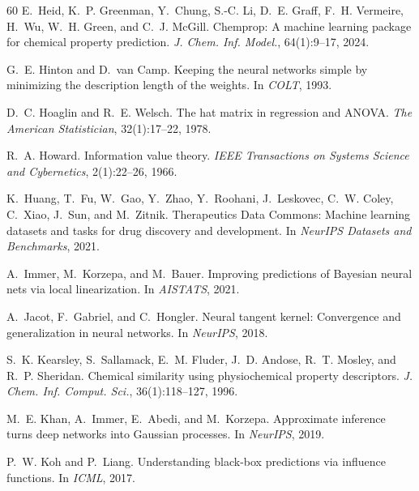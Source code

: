 \documentclass[10pt,twocolumn,letterpaper]{article}
\theoremstyle{definition}
\begin{document}
\begin{thebibliography}{60}
E.~Heid, K.~P. Greenman, Y.~Chung, S.-C. Li, D.~E. Graff, F.~H. Vermeire, H.~Wu, W.~H. Green, and C.~J. McGill.
\newblock Chemprop: A machine learning package for chemical property prediction.
\newblock \emph{J. Chem. Inf. Model.}, 64(1):9--17, 2024.

G.~E. Hinton and D.~van Camp.
\newblock Keeping the neural networks simple by minimizing the description length of the weights.
\newblock In \emph{COLT}, 1993.

D.~C. Hoaglin and R.~E. Welsch.
\newblock The hat matrix in regression and {ANOVA}.
\newblock \emph{The American Statistician}, 32(1):17--22, 1978.

R.~A. Howard.
\newblock Information value theory.
\newblock \emph{IEEE Transactions on Systems Science and Cybernetics}, 2(1):22--26, 1966.

K.~Huang, T.~Fu, W.~Gao, Y.~Zhao, Y.~Roohani, J.~Leskovec, C.~W. Coley, C.~Xiao, J.~Sun, and M.~Zitnik.
\newblock Therapeutics {D}ata {C}ommons: Machine learning datasets and tasks for drug discovery and development.
\newblock In \emph{NeurIPS Datasets and Benchmarks}, 2021.

A.~Immer, M.~Korzepa, and M.~Bauer.
\newblock Improving predictions of {B}ayesian neural nets via local linearization.
\newblock In \emph{AISTATS}, 2021.

A.~Jacot, F.~Gabriel, and C.~Hongler.
\newblock Neural tangent kernel: Convergence and generalization in neural networks.
\newblock In \emph{NeurIPS}, 2018.

S.~K. Kearsley, S.~Sallamack, E.~M. Fluder, J.~D. Andose, R.~T. Mosley, and R.~P. Sheridan.
\newblock Chemical similarity using physiochemical property descriptors.
\newblock \emph{J. Chem. Inf. Comput. Sci.}, 36(1):118--127, 1996.

M.~E. Khan, A.~Immer, E.~Abedi, and M.~Korzepa.
\newblock Approximate inference turns deep networks into {G}aussian processes.
\newblock In \emph{NeurIPS}, 2019.

P.~W. Koh and P.~Liang.
\newblock Understanding black-box predictions via influence functions.
\newblock In \emph{ICML}, 2017.


\end{thebibliography}
\end{document}
